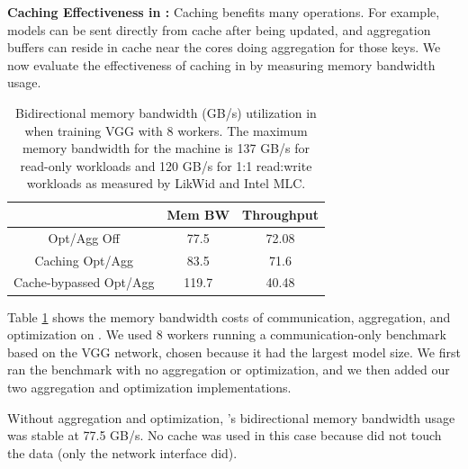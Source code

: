 
\vspace{0.05in}
\noindent \textbf{Caching Effectiveness in \phub:}
\label{eval:cache}
Caching benefits many \phub operations. For example, models can be sent directly from cache after being updated, and aggregation buffers can reside in cache near the cores doing aggregation for those keys. We now evaluate the effectiveness of caching in \phub by measuring memory bandwidth usage.

\begin{table}[t!]
	\centering
    \footnotesize
	\begin{tabular}{|c|c|c|}
		\hline 
		& Mem BW & Throughput\\
		\hline
		Opt/Agg Off & 77.5 & 72.08 \\
		\hline 
		Caching Opt/Agg & 83.5 & 71.6 \\
		\hline
		Cache-bypassed Opt/Agg & 119.7 & 40.48 \\
		\hline
	\end{tabular}
	\caption{Bidirectional memory bandwidth (GB/s) utilization in \phub when training VGG with 8 workers. The maximum memory bandwidth for the machine is 137 GB/s for read-only workloads and 120 GB/s for 1:1 read:write workloads as measured by LikWid and Intel MLC.}
	\label{table:cacheUtilizationAndAggregationOverhead}
\end{table}

Table \ref{table:cacheUtilizationAndAggregationOverhead} shows the memory bandwidth costs of communication, aggregation, and optimization on \pbox. We used 8 workers running a communication-only benchmark based on the VGG network, chosen because it had the largest model size. We first ran the benchmark with no aggregation or optimization, and we then added our two aggregation and optimization implementations.

Without aggregation and optimization, \pbox{}'s bidirectional memory bandwidth usage was stable at 77.5 GB/s. No cache was used in this case because \pbox did not touch the data (only the network interface did).

